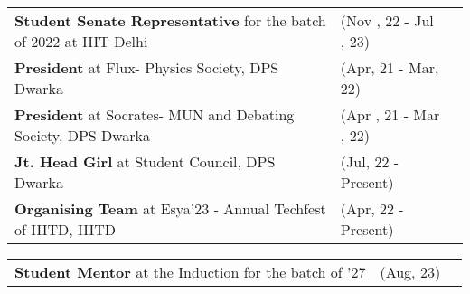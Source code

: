 \documentclass[10pt]{extarticle}
\begin{document}
\begin{contained}
\begin{longtable}{p{}p{}p{}}
    \textbf{Student Senate Representative} for the batch of 2022 at IIIT Delhi & (Nov , 22 - Jul , 23)\\
    \textbf{President} at Flux- Physics Society, DPS Dwarka & (Apr, 21 - Mar, 22)\\
    \textbf{President} at Socrates- MUN and Debating Society, DPS Dwarka & (Apr , 21 - Mar , 22)\\
    \textbf{Jt. Head Girl} at Student Council, DPS Dwarka & (Jul, 22 - Present)\\
    \textbf{Organising Team} at Esya'23 - Annual Techfest of IIITD, IIITD & (Apr, 22 - Present)\\
\end{longtable}
\vspace{-6pt}
\end{contained}
\begin{contained} 
\begin{longtable}{p{}p{}p{}}
    \textbf{Student Mentor} at the Induction for the batch of '27  & (Aug, 23)\\
\end{longtable}
\vspace{-6pt}
\end{contained}
\end{document}
